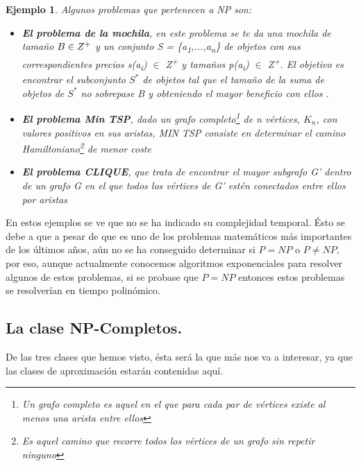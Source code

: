 \documentclass[a4paper,12pt,titlepage]{article}
\newtheorem{eje}{Ejemplo}[section]
\begin{document}
\begin{eje}

Algunos problemas que pertenecen a NP son:

\begin{itemize}

  \item \textbf{El problema de la mochila}, en este problema se te da una mochila de tamaño $B \in Z\textsuperscript{+}$ y un conjunto S = \{a\textsubscript{1},...,a\textsubscript{n}\} de objetos con sus correspondientes precios s(a\textsubscript{i}) $\in$ Z\textsuperscript{+} y tamaños p(a\textsubscript{i}) $\in$ Z\textsuperscript{+}. El objetivo es encontrar el subconjunto $S^{*}$ de objetos tal que el tamaño de la suma de objetos de $S^{*}$ no sobrepase B y obteniendo el mayor beneficio con ellos \cite{knapsack1}.
  \item \textbf{El problema Min TSP}, dado un grafo completo\footnote{Un grafo completo es aquel en el que para cada par de v\'ertices existe al menos una arista entre ellos} de n v\'ertices, $K_{n}$, con valores positivos en sus aristas, MIN TSP consiste en determinar el camino Hamiltoniano\footnote{Es aquel camino que recorre todos los v\'ertices de un grafo sin repetir ninguno} de menor coste \cite{approx_core}
  \item \textbf{El problema CLIQUE}, que trata de encontrar el mayor subgrafo G' dentro de un grafo G en el que todos los v\'ertices de G' est\'en conectados entre ellos por aristas
  
\end{itemize}

\end{eje}

En estos ejemplos se ve que no se ha indicado su complejidad temporal. \'Esto
se debe a que a pesar de que es uno de los problemas matem\'aticos m\'as
importantes de los \'ultimos años, a\'un no se ha conseguido determinar
si $P = NP$ o $P \neq NP$, por eso, aunque actualmente conocemos algoritmos
exponenciales para resolver algunos de estos problemas, si se probase que
$P = NP$ entonces estos problemas se resolver\'ian en tiempo polin\'omico.

\subsection{La clase NP-Completos.}

De las tres clases que hemos visto, \'esta ser\'a la que m\'as nos va a
interesar, ya que las clases de aproximaci\'on estar\'an contenidas aqu\'i.
\end{document}
